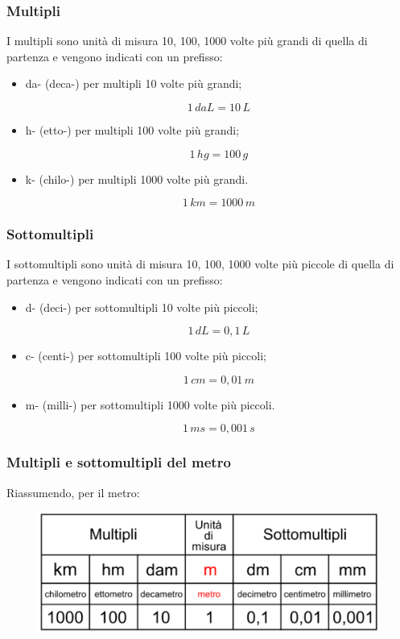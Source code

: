 \documentclass[handout]{beamer}
\theoremstyle{plain}
\begin{document}
\begin{frame}
\frametitle{Multipli}
I multipli sono unità di misura 10, 100, 1000 volte più grandi di quella di partenza e vengono indicati con un prefisso:
\begin{itemize}
  \item \alert{da-} (deca-) per multipli \alert{10 volte più grandi};\pause
  
  \[ 1 \, daL = 10 \, L \]\pause
  \item \alert{h-} (etto-) per multipli \alert{100 volte più grandi};\pause
  
  \[ 1 \, hg = 100 \, g \]\pause

  \item \alert{k-} (chilo-) per multipli \alert{1000 volte più grandi}.\pause
  
  \[ 1 \, km = 1000 \, m \]
\end{itemize}
\end{frame}




\begin{frame}
\frametitle{Sottomultipli}
I sottomultipli sono unità di misura 10, 100, 1000 volte più piccole di quella di partenza e vengono indicati con un prefisso:
\begin{itemize}
  \item \alert{d-} (deci-) per sottomultipli \alert{10 volte più piccoli};\pause
  
  \[ 1 \, dL = 0,1 \, L \]\pause
  \item \alert{c-} (centi-) per sottomultipli \alert{100 volte più piccoli};\pause
  
  \[ 1 \, cm = 0,01 \, m \]\pause

  \item \alert{m-} (milli-) per sottomultipli \alert{1000 volte più piccoli}.\pause
  
  \[ 1 \, ms = 0,001 \, s \]
\end{itemize}
\end{frame}


\begin{frame}
\frametitle{Multipli e sottomultipli del metro}
Riassumendo, per il metro:
\begin{figure}
  \includegraphics[width=\columnwidth]{img/metro.png}
\end{figure}
\end{frame}
\end{document}

